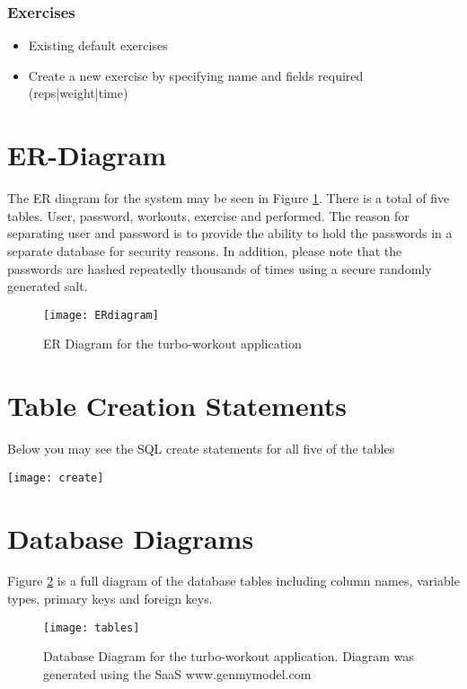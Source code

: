 \documentclass{article}
\begin{document}
\subsubsection{Exercises}
\begin{itemize}
    \item {Existing default exercises}
    \item {Create a new exercise by specifying name and fields required (reps|weight|time)}
\end{itemize}

\section{ER-Diagram}

The ER diagram for the system may be seen in Figure \ref{fig:erdiagram}. There is a total of five tables. User, password, workouts, exercise and performed. The reason for separating user and password is to provide the ability to hold the passwords in a separate database for security reasons. In addition, please note that the passwords are hashed repeatedly thousands of times using a secure randomly generated salt.

\begin{figure}[h]
\caption{ER Diagram for the turbo-workout application}
\label{fig:erdiagram}
\texttt{[image: ERdiagram]}
\end{figure}

\section{Table Creation Statements}

Below you may see the SQL create statements for all five of the tables

\texttt{[image: create]}

\section{Database Diagrams}

Figure \ref{fig:table} is a full diagram of the database tables including column names, variable types, primary keys and foreign keys. 

\begin{figure}[h]
\caption{Database Diagram for the turbo-workout application. Diagram was generated using the SaaS www.genmymodel.com}
\label{fig:table}
\texttt{[image: tables]}
\end{figure}
\end{document}
